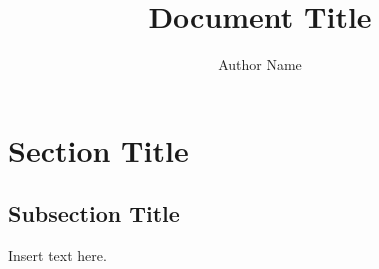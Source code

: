 \documentclass[8pt]{mpscheatsheet}
\author{Author Name}
\title{Document Title}
\begin{document}
    \section*{Section Title}
    \subsection*{Subsection Title}
        Insert text here.
\end{document}
